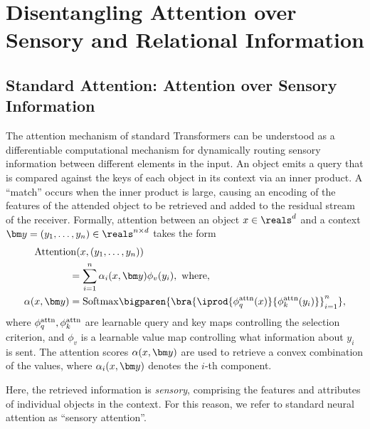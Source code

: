 \section{Disentangling Attention over Sensory and Relational Information}

\subsection{Standard Attention: Attention over Sensory Information}

The attention mechanism of standard Transformers can be understood as a differentiable computational mechanism for dynamically routing sensory information between different elements in the input.
An object emits a query that is compared against the keys of each object in its context via an inner product. A ``match'' occurs when the inner product is large, causing an encoding of the features of the attended object to be retrieved and added to the residual stream of the receiver. Formally, attention between an object $x \in \reals^d$ and a context $\y = \ys \in \reals^{n \times d}$ takes the form
\begin{equation}\label{eq:self_attn}
  \begin{split}
    &\hspace{-35pt}\Attn(x, \ys) \\
    &= \sum_{i=1}^{n} \alpha_i(x, \y) \phi_v(y_i), \ \text{where}, \\
    \alpha(x, \y) &= \Softmax\bigparen{\bra{\iprod{\phiqattn(x)}{\phikattn(y_i)}}_{i=1}^{n}},
  \end{split}
\end{equation}
where $\phi_q^{\mathrm{attn}},\phi_k^{\mathrm{attn}}$ are learnable query and key maps controlling the selection criterion, and $\phi_v$ is a learnable value map controlling what information about $y_i$ is sent. The attention scores $\alpha(x, \y)$ are used to retrieve a convex combination of the values, where $\alpha_i(x, \y)$ denotes the $i$-th component.

Here, the retrieved information is \textit{sensory}, comprising the features and attributes of individual objects in the context. For this reason, we refer to standard neural attention as ``sensory attention''.


